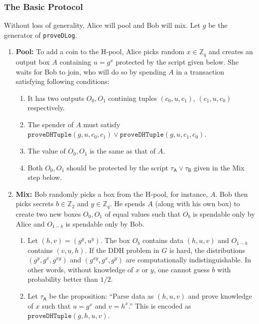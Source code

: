 \documentclass[11pt]{article}
\begin{document}
\subsubsection{The Basic Protocol}
 Without loss of generality, Alice will pool and Bob will mix. 
Let $g$ be the generator of \texttt{proveDLog}.
\begin{enumerate}
	\item \textbf{Pool:} To add a coin to the H-pool, Alice picks random $x\in \mathbb{Z}_q$ and creates an output box $A$ containing $u = g^x$ protected by the script given below. She waits for Bob to join, who will do so by spending $A$ in a transaction satisfying following conditions: 
	
	\begin{enumerate}
		\item It has two outputs $O_0, O_1$ contining tuples $(c_0, u, c_1)$, $(c_1, u, c_0)$ respectively. 
		\item The spender of $A$ must satisfy $\texttt{proveDHTuple}(g, u, c_0, c_1)\lor \texttt{proveDHTuple}(g, u, c_1, c_0)$.
		\item The value of $O_0, O_1$ is the same as that of $A$.
		\item Both $O_0, O_1$ should be protected by the script $\tau_\textsf{A} \lor \tau_\textsf{B}$ given in the Mix step below.
	\end{enumerate}
	
	
	\item \textbf{Mix:} Bob randomly picks a box from the H-pool, for instance, $A$. Bob then picks secrets $b \in \mathbb{Z}_2$ and $y \in \mathbb{Z}_q$. He spends $A$ (along with his own box) to create two new boxes $O_0, O_1$ of equal values such that $O_b$ is spendable only by Alice and $O_{1-b}$ is spendable only by Bob. 
	
	\begin{enumerate}
		\item Let $(h, v) = ({g}^{y}, {u}^{y})$.  
		The box $O_b$ contains data $(h, u, v)$ and $O_{1-b}$ contains $(v, u, h)$. If the DDH problem in $G$ is hard, the distributions $({g}^{y}, {g}^{x}, {g}^{xy})$ and 
		$({g}^{xy}, {g}^{x}, {g}^{y})$ are computationally indistinguishable. In other words, without knowledge of $x$ or $y$, one cannot guess $b$ with probability better than $1/2$.
		\item  Let 
		$\tau_\textsf{A}$ be the proposition: ``Parse data as $(h, u, v)$ and
		prove knowledge of $x$ such that $u = {g}^{x}$ and ${v} = {h}^{x}$.'' This is encoded as $\texttt{proveDHTuple}(g, h, u, v)$.
		

\end{enumerate}
\end{enumerate}
\end{document}
